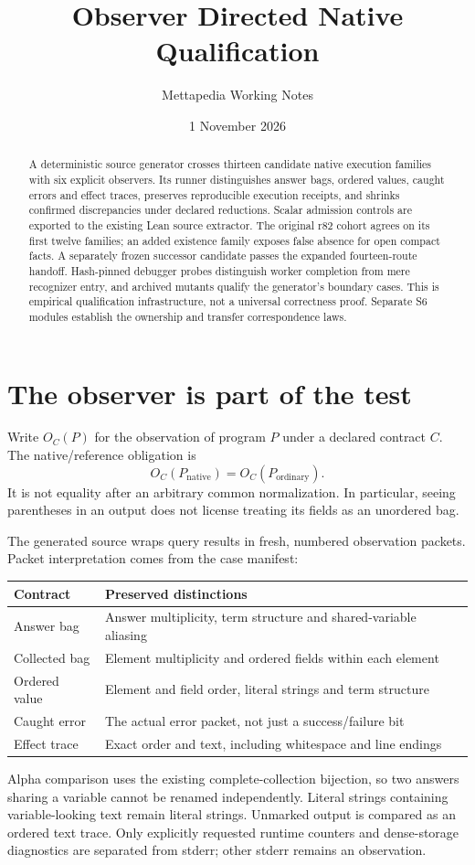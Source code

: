 \documentclass[11pt,a4paper]{article}
\title{Observer Directed Native Qualification}
\author{Mettapedia Working Notes}
\date{1 November 2026}
\begin{document}
\maketitle
\begin{abstract}
A deterministic source generator crosses thirteen candidate native execution
families with six explicit observers. Its runner distinguishes answer bags,
ordered values, caught errors and effect traces, preserves reproducible
execution receipts, and shrinks confirmed discrepancies under declared
reductions. Scalar admission controls are exported to the existing Lean
source extractor. The original r82 cohort agrees on its first twelve families;
an added existence family exposes false absence for open compact facts. A
separately frozen successor candidate passes the expanded fourteen-route
handoff. Hash-pinned
debugger probes distinguish worker completion from mere recognizer entry,
and archived mutants qualify the generator's boundary cases. This is empirical
qualification infrastructure, not a universal correctness proof. Separate S6
modules establish the ownership and transfer correspondence laws.
\end{abstract}

\section{The observer is part of the test}

Write $O_C(P)$ for the observation of program $P$ under a declared contract
$C$. The native/reference obligation is
\[
 O_C(P_{\mathrm{native}})=O_C(P_{\mathrm{ordinary}}).
\]
It is not equality after an arbitrary common normalization. In particular,
seeing parentheses in an output does not license treating its fields as an
unordered bag.

The generated source wraps query results in fresh, numbered observation
packets. Packet interpretation comes from the case manifest:
\begin{center}
\begin{tabularx}{\linewidth}{@{}lX@{}}
\toprule
Contract & Preserved distinctions\\
\midrule
Answer bag & Answer multiplicity, term structure and shared-variable aliasing\\
Collected bag & Element multiplicity and ordered fields within each element\\
Ordered value & Element and field order, literal strings and term structure\\
Caught error & The actual error packet, not just a success/failure bit\\
Effect trace & Exact order and text, including whitespace and line endings\\
\bottomrule
\end{tabularx}
\end{center}
Alpha comparison uses the existing complete-collection bijection, so two
answers sharing a variable cannot be renamed independently. Literal strings
containing variable-looking text remain literal strings. Unmarked output is
compared as an ordered text trace. Only explicitly requested runtime counters
and dense-storage diagnostics are separated from stderr; other stderr remains
an observation.
\end{document}
